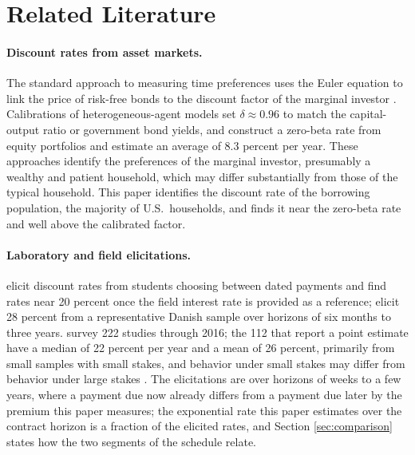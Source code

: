 \section{Related Literature}\label{sec:literature}

\paragraph{Discount rates from asset markets.} The standard approach to measuring time preferences uses the Euler equation to link the price of risk-free bonds to the discount factor of the marginal investor \citep{lustig_market_2005, bansal_risks_2004}. Calibrations of heterogeneous-agent models set $\delta \approx 0.96$ to match the capital-output ratio \citep{guvenen_reconciling_2006} or government bond yields, and \citet{di_tella_zero-beta_2024} construct a zero-beta rate from equity portfolios and estimate an average of 8.3 percent per year. These approaches identify the preferences of the marginal investor, presumably a wealthy and patient household, which may differ substantially from those of the typical household. This paper identifies the discount rate of the borrowing population, the majority of U.S.\ households, and finds it near the zero-beta rate and well above the calibrated factor.

\paragraph{Laboratory and field elicitations.} \citet{coller_eliciting_1999} elicit discount rates from students choosing between dated payments and find rates near 20 percent once the field interest rate is provided as a reference; \citet{harrison_estimating_2002} elicit 28 percent from a representative Danish sample over horizons of six months to three years. \citet{cohen_measuring_2020} survey 222 studies through 2016; the 112 that report a point estimate have a median of 22 percent per year and a mean of 26 percent, primarily from small samples with small stakes, and behavior under small stakes may differ from behavior under large stakes \citep{rabin_risk_2000}. The elicitations are over horizons of weeks to a few years, where a payment due now already differs from a payment due later by the premium this paper measures; the exponential rate this paper estimates over the contract horizon is a fraction of the elicited rates, and Section \ref{sec:comparison} states how the two segments of the schedule relate.

